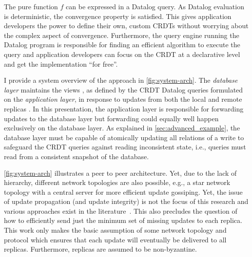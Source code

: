 The pure function \( f \) can be expressed in a Datalog query.
As Datalog evaluation is deterministic, the convergence property is satisfied.
This gives application developers the power to define their own, custom CRDTs
without worrying about the complex aspect of convergence.
Furthermore, the query engine running the Datalog program is responsible
for finding an efficient algorithm to execute the query and application developers
can focus on the CRDT at a declarative level and get the implementation ``for free''.





I provide a system overview of the approach in \autoref{fig:system-arch}.
The \emph{database layer} maintains the views \deltaO{},
as defined by the \ac{CRDT} Datalog queries formulated on the \emph{application layer},
in response to updates from both the local  and remote replicas
.
In this presentation, the application layer is responsible for forwarding updates
to the database layer but forwarding could equally well happen exclusively
on the database layer.
As explained in \ref{sec:advanced_example}, the database layer must be capable
of atomically updating all relations of a write to safeguard the \ac{CRDT} queries
against reading inconsistent state,
i.e., queries must read from a consistent snapshot of the database.

\autoref{fig:system-arch} illustrates a peer to peer architecture.
Yet, due to the lack of hierarchy, different network topologies are also possible,
e.g., a star network topology with a central server for more efficient update gossiping.
Yet, the issue of update propagation (and update integrity) is not the focus
of this research and various approaches exist in the literature~\cite{
	auvolat2019merkle, sanjuan2020merkle, kleppmann2024bluesky,
	kleppmann2022making}.
This also precludes the question of how to efficiently send just the minimum
set of missing updates to each replica.
This work only makes the basic assumption of some network topology and protocol
which ensures that each update will eventually be delivered to all replicas.
Furthermore, replicas are assumed to be non-byzantine.

